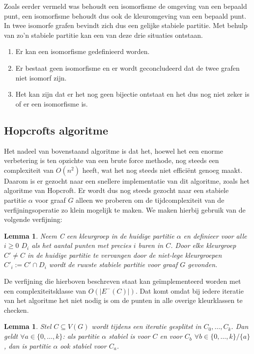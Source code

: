 \documentclass[twoside]{article}
\newtheorem{lemma}[theorem]{Lemma}
\begin{document}
\begin{multicols}{2}
Zoals eerder vermeld was behoudt een isomorfisme de omgeving van een bepaald punt, een isomorfisme behoudt dus ook de kleuromgeving van een bepaald punt. In twee isomorfe grafen bevindt zich dus een gelijke stabiele partitie. Met behulp van zo'n stabiele partitie kan een van deze drie situaties ontstaan.
\begin{enumerate}
\item Er kan een isomorfisme gedefinieerd worden.
\item Er bestaat geen isomorfisme en er wordt geconcludeerd dat  de twee grafen niet isomorf zijn.
\item Het kan zijn dat er het nog geen bijectie ontstaat en het dus nog niet zeker is of er een isomorfisme is.
\end{enumerate}

\subsection{Hopcrofts algoritme}
Het nadeel van bovenstaand algoritme is dat het, hoewel het een enorme verbetering is ten opzichte van een brute force methode, nog steeds een complexiteit van $O(n^2)$ heeft, wat het nog steeds niet efficiënt genoeg maakt. Daarom is er gezocht naar een snellere implementatie van dit algoritme, zoals het algoritme van Hopcroft. Er wordt dus nog steeds gezocht naar een stabiele partitie $\alpha$ voor graaf $G$ alleen we proberen om de tijdcomplexiteit van de verfijningsoperatie zo klein mogelijk te maken. We maken hierbij gebruik van de volgende verfijning:

\begin{lemma}
Neem C een kleurgroep in de huidige partitie $\alpha$ en definieer voor alle $i \geq 0$ $D_{i}$ als het aantal punten met precies $i$ buren in $C$. Door elke kleurgroep $C' \neq C$ in de huidige partitie te vervangen door de niet-lege kleurgroepen $C'_{i} := C'\cap D_{i}$ wordt de ruwste stabiele partitie voor graaf $G$ gevonden.
\cite{slides_DFA}
\label{verfijn}
\end{lemma}

De verfijning die hierboven beschreven staat kan ge\"implementeerd worden met een complexiteitsklasse van $O(|E^{-}(C)|)$. Dat komt omdat bij iedere iteratie van het algoritme het niet nodig is om de punten in alle overige kleurklassen te checken.

\begin{lemma}
Stel $C \subseteq V(G)$ wordt tijdens een iteratie gesplitst in $C_{0}, \ldots, C_{k}$. Dan geldt $\forall a \in \{0,\ldots,k\}$: als partitie $\alpha$ stabiel is voor $C$ en voor $C_{b}$ $\forall b \in \{0,\ldots,k\}/\{a\}$, dan is partitie $\alpha$ ook stabiel voor $C_{a}$.
\label{weglaat}
\end{lemma}


\end{multicols}
\end{document}
